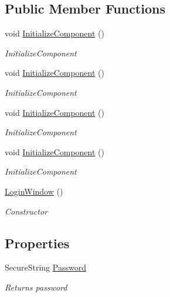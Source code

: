 \subsection*{Public Member Functions}
\begin{DoxyCompactItemize}
\item 
void \hyperlink{class_baudi_1_1_client_1_1_view_1_1_login_window_a37ff0171c06db81a8562d9d544dac849}{Initialize\+Component} ()
\begin{DoxyCompactList}\small\item\em Initialize\+Component \end{DoxyCompactList}\item 
void \hyperlink{class_baudi_1_1_client_1_1_view_1_1_login_window_a37ff0171c06db81a8562d9d544dac849}{Initialize\+Component} ()
\begin{DoxyCompactList}\small\item\em Initialize\+Component \end{DoxyCompactList}\item 
void \hyperlink{class_baudi_1_1_client_1_1_view_1_1_login_window_a37ff0171c06db81a8562d9d544dac849}{Initialize\+Component} ()
\begin{DoxyCompactList}\small\item\em Initialize\+Component \end{DoxyCompactList}\item 
void \hyperlink{class_baudi_1_1_client_1_1_view_1_1_login_window_a37ff0171c06db81a8562d9d544dac849}{Initialize\+Component} ()
\begin{DoxyCompactList}\small\item\em Initialize\+Component \end{DoxyCompactList}\item 
\hyperlink{class_baudi_1_1_client_1_1_view_1_1_login_window_acc604b478a7c984920d49953b9c0d3d7}{Login\+Window} ()
\begin{DoxyCompactList}\small\item\em Constructor \end{DoxyCompactList}\end{DoxyCompactItemize}
\subsection*{Properties}
\begin{DoxyCompactItemize}
\item 
Secure\+String \hyperlink{class_baudi_1_1_client_1_1_view_1_1_login_window_aab55a12a9c6ea04fea9501d825cb12b5}{Password}
\begin{DoxyCompactList}\small\item\em Returns password \end{DoxyCompactList}\end{DoxyCompactItemize}


